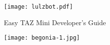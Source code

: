 %
%
%
%
%

\date {}
\thispagestyle{empty}
\begin{center}
\par
\texttt{[image: lulzbot.pdf]}

{\fontsize{25pt}{5cm}\selectfont \textcolor{ao-purple}{Easy TAZ Mini Developer's Guide}}

\texttt{[image: begonia-1.jpg]}




\end{center}
